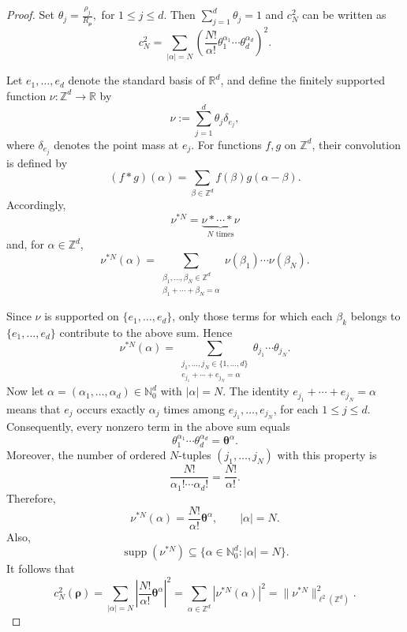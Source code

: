 \documentclass[12pt, reqno]{amsart}
\numberwithin{equation}{section}
\begin{document}
\begin{proof}
Set
$\theta_j = \frac{\rho_j}{R_{\boldsymbol{\rho}}},$  for $ 1\leq j\leq d.$
Then $\sum_{j=1}^d\theta_j=1$ and $c_N^2$ can be written as
\[
c_N^2
=
\sum_{|\alpha|=N}
\left(
\frac{N!}{\alpha!}
\theta_1^{\alpha_1}\cdots\theta_d^{\alpha_d}
\right)^2.
\]

Let $e_1,\ldots,e_d$ denote the standard basis of $\mathbb R^d$, and define the finitely supported function $\nu:\mathbb Z^d\to\mathbb R$ by
\[
\nu:=\sum_{j=1}^d\theta_j\delta_{e_j},
\]
where $\delta_{e_j}$ denotes the point mass at $e_j$. For functions
$f,g$ on $\mathbb Z^d$, their convolution is defined by
\[
(f*g)(\alpha)
=
\sum_{\beta\in\mathbb Z^d}
f(\beta)g(\alpha-\beta).
\]
Accordingly,
\[
\nu^{*N}
=
\underbrace{\nu*\cdots*\nu}_{N\text{ times}}
\]
and, for $\alpha\in\mathbb Z^d$,
\[
\nu^{*N}(\alpha)
=
\sum_{\substack{\beta_1,\ldots,\beta_N\in\mathbb Z^d\\
\beta_1+\cdots+\beta_N=\alpha}}
\nu(\beta_1)\cdots\nu(\beta_N).
\]

Since $\nu$ is supported on $\{e_1,\ldots,e_d\}$, only those terms
for which each $\beta_k$ belongs to $\{e_1,\ldots,e_d\}$ contribute to
the above sum. Hence
\[
\nu^{*N}(\alpha)
=
\sum_{\substack{
j_1,\ldots,j_N\in\{1,\ldots,d\}\\
e_{j_1}+\cdots+e_{j_N}=\alpha
}}
\theta_{j_1}\cdots\theta_{j_N}.
\]
Now let $\alpha=(\alpha_1,\ldots,\alpha_d)\in\mathbb N_0^d$ with
$|\alpha|=N$. The identity $e_{j_1}+\cdots+e_{j_N}=\alpha$
means that $e_j$ occurs exactly $\alpha_j$ times among
$e_{j_1},\ldots,e_{j_N}$, for each $1\leq j\leq d$. Consequently,
every nonzero term in the above sum equals
\[
\theta_1^{\alpha_1}\cdots\theta_d^{\alpha_d}
=
\boldsymbol{\theta}^\alpha.
\]
Moreover, the number of ordered $N$-tuples
$(j_1,\ldots,j_N)$ with this property is
\[
\frac{N!}{\alpha_1!\cdots\alpha_d!}
=
\frac{N!}{\alpha!}.
\]
Therefore,
\[
\nu^{*N}(\alpha)
=
\frac{N!}{\alpha!}\boldsymbol{\theta}^\alpha,
\qquad |\alpha|=N.
\]
Also,
\[
\operatorname{supp}(\nu^{*N})
\subseteq
\{\alpha\in\mathbb N_0^d:|\alpha|=N\}.
\]
It follows that
\begin{equation}\label{eq:convolution}
c_N^2(\boldsymbol{\rho})
=
\sum_{|\alpha|=N}
\left|
\frac{N!}{\alpha!}\boldsymbol{\theta}^\alpha
\right|^2
=
\sum_{\alpha\in\mathbb Z^d}
|\nu^{*N}(\alpha)|^2
=
\|\nu^{*N}\|_{\ell^2(\mathbb Z^d)}^2.
\end{equation}


\end{proof}
\end{document}
